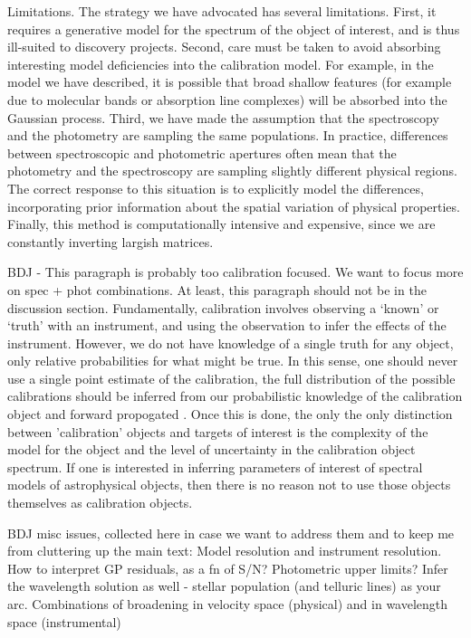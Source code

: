 \documentclass[iop,numberedappendix]{emulateapj}
\begin{document}
Limitations.  The strategy we have advocated has several limitations.
First, it requires a generative model for the spectrum of the object
of interest, and is thus ill-suited to discovery projects.  Second,
care must be taken to avoid absorbing interesting model deficiencies
into the calibration model. For example, in the model we have
described, it is possible that broad shallow features (for example due
to molecular bands or absorption line complexes) will be absorbed into
the Gaussian process. Third, we have made the assumption that the
spectroscopy and the photometry are sampling the same populations.  In
practice, differences between spectroscopic and photometric apertures
often mean that the photometry and the spectroscopy are sampling
slightly different physical regions.  The correct response to this
situation is to explicitly model the differences, incorporating prior
information about the spatial variation of physical properties.
Finally, this method is computationally intensive and expensive, since
we are constantly inverting largish matrices.

{\color{blue} BDJ - This paragraph is probably too calibration
focused. We want to focus more on spec + phot combinations.  At least,
this paragraph should not be in the discussion section.}
Fundamentally, calibration involves observing a `known' or `truth'
with an instrument, and using the observation to infer the effects of
the instrument.  However, we do not have knowledge of a single truth
for any object, only relative probabilities for what might be true.
In this sense, one should never use a single point estimate of the
calibration, the full distribution of the possible calibrations should
be inferred from our probabilistic knowledge of the calibration object
and forward propogated \citep[e.g.][]{lee11}. Once this is done, the only the
only distinction between 'calibration' objects and targets of interest
is the complexity of the model for the object and the level of
uncertainty in the calibration object spectrum.  If one is interested
in inferring parameters of interest of spectral models of
astrophysical objects, then there is no reason not to use those
objects themselves as calibration objects.

BDJ misc issues, collected here in case we want to address them and to
keep me from cluttering up the main text: Model resolution and
instrument resolution.  How to interpret GP residuals, as a fn of S/N?
Photometric upper limits? Infer the wavelength solution as well -
stellar population (and telluric lines) as your arc. Combinations of
broadening in velocity space (physical) and in wavelength space
(instrumental)
\end{document}
